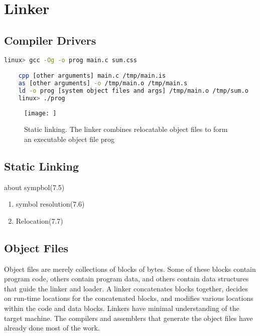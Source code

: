 \chapter{Linker}

\section{Compiler Drivers}



\begin{lstlisting}[language=bash]
    linux> gcc -Og -o prog main.c sum.css

    cpp [other arguments] main.c /tmp/main.is
    as [other arguments] -o /tmp/main.o /tmp/main.s
    ld -o prog [system object files and args] /tmp/main.o /tmp/sum.o
    linux> ./prog
\end{lstlisting}

\begin{figure}[h!]
    \centering
    \texttt{[image: ]}
    \caption{Static linking. The linker combines relocatable object files to form an executable object file prog}
\end{figure}



\section{Static Linking}

about sympbol(7.5)
\begin{enumerate}
    \item symbol resolution(7.6)
    \item Relocation(7.7)
\end{enumerate}

\section{Object Files}

Object files are merely collections of blocks
of bytes. Some of these blocks contain program code, others contain program
data, and others contain data structures that guide the linker and loader. A linker
concatenates blocks together, decides on run-time locations for the concatenated
blocks, and modifies various locations within the code and data blocks. Linkers
have minimal understanding of the target machine. The compilers and assemblers
that generate the object files have already done most of the work.


